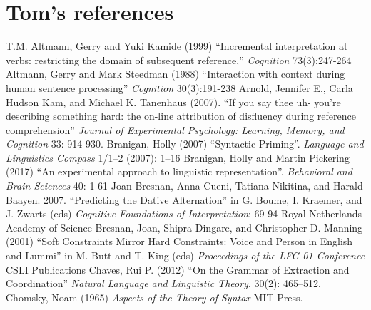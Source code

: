 \documentclass[a4paper]{article}
\begin{document}
{\sloppy
\printbibliography[heading=subbibliography,notkeyword=this] 
}

\section*{Tom's references}

T.M. Altmann, Gerry and Yuki Kamide (1999)
``Incremental interpretation at verbs: restricting the domain of subsequent reference,''
{\it Cognition} 73(3):247-264
\newline
\newline
 Altmann, Gerry  and Mark Steedman (1988) ``Interaction with context during human sentence processing'' 
{\it Cognition} 30(3):191-238
\newline
\newline
Arnold, Jennifer E., Carla Hudson Kam, and Michael K. Tanenhaus (2007). ``If you say thee uh- you’re describing something hard: the on-line attribution of disfluency during reference comprehension'' {\it Journal of Experimental Psychology: Learning, Memory, and Cognition} 33: 914-930.
\newline
\newline
Branigan, Holly (2007) ``Syntactic Priming''.  {\it Language and Linguistics Compass} 1/1–2 (2007): 1–16
\newline
\newline
Branigan, Holly and Martin Pickering (2017) ``An experimental approach to
linguistic representation''.  {\it Behavioral and Brain Sciences} 40: 1-61
\newline
\newline
Joan Bresnan, Anna Cueni, Tatiana Nikitina, and Harald Baayen. 2007. ``Predicting the Dative Alternation'' in  G. Boume, I. Kraemer, and J. Zwarts (eds) {\it Cognitive Foundations of Interpretation}: 69-94  Royal Netherlands Academy of Science
\newline
\newline
Bresnan, Joan, Shipra Dingare, and Christopher D. Manning (2001) ``Soft Constraints Mirror Hard
Constraints: Voice and Person in English and
Lummi'' in M. Butt and T. King (eds) {\it Proceedings of the LFG 01
Conference}
CSLI
Publications
\newline
\newline
Chaves, Rui P. (2012) ``On the Grammar of Extraction and Coordination'' {\it Natural Language and Linguistic Theory}, 30(2): 465–512.
\newline
\newline
Chomsky, Noam (1965) {\it Aspects of the Theory of Syntax}  MIT Press.
\end{document}
